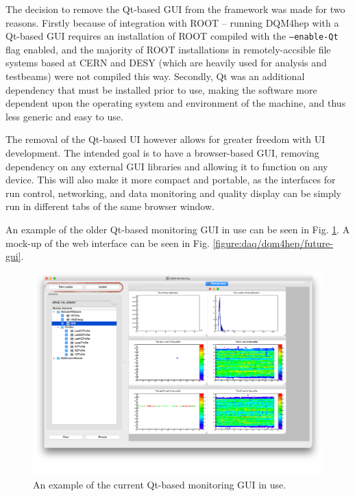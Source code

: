 The decision to remove the Qt-based GUI from the framework was made for two reasons. Firstly because of integration with ROOT -- running DQM4hep with a Qt-based GUI requires an installation of ROOT compiled with the \texttt{--enable-Qt} flag enabled, and the majority of ROOT installations in remotely-accsible file systems based at CERN and DESY (which are heavily used for analysis and testbeams) were not compiled this way. Secondly, Qt was an additional dependency that must be installed prior to use, making the software more dependent upon the operating system and environment of the machine, and thus less generic and easy to use.

The removal of the Qt-based UI however allows for greater freedom with UI development. The intended goal is to have a browser-based GUI, removing dependency on any external GUI libraries and allowing it to function on any device. This will also make it more compact and portable, as the interfaces for run control, networking, and data monitoring and quality display can be simply run in different tabs of the same browser window.

An example of the older Qt-based monitoring GUI in use can  be seen in Fig. \ref{figure:daq/dqm4hep/old-gui}. A mock-up of the web interface can be seen in Fig. \ref{figure:daq/dqm4hep/future-gui}.

\begin{figure}
	\centering
	\includegraphics[width=1.0\textwidth]{../Pictures/DQM4hepMonitoringGui.png}
	\caption{An example of the current Qt-based monitoring GUI in use.}
	\label{figure:daq/dqm4hep/old-gui}
\end{figure}

